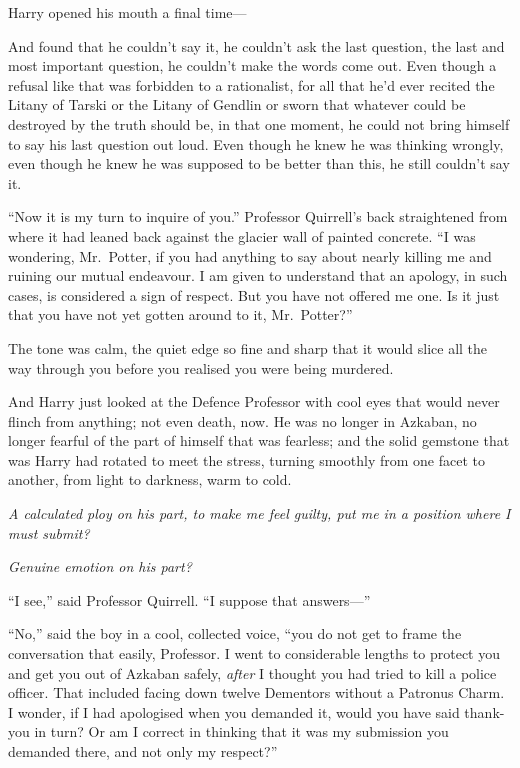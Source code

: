 Harry opened his mouth a final time---

And found that he couldn't say it, he couldn't ask the last question,
the last and most important question, he couldn't make the words come
out. Even though a refusal like that was forbidden to a rationalist, for
all that he'd ever recited the Litany of Tarski or the Litany of Gendlin
or sworn that whatever could be destroyed by the truth should be, in
that one moment, he could not bring himself to say his last question out
loud. Even though he knew he was thinking wrongly, even though he knew
he was supposed to be better than this, he still couldn't say it.

``Now it is my turn to inquire of you.'' Professor Quirrell's back
straightened from where it had leaned back against the glacier wall of
painted concrete. ``I was wondering, Mr.~Potter, if you had anything to
say about nearly killing me and ruining our mutual endeavour. I am given
to understand that an apology, in such cases, is considered a sign of
respect. But you have not offered me one. Is it just that you have not
yet gotten around to it, Mr.~Potter?''

The tone was calm, the quiet edge so fine and sharp that it would slice
all the way through you before you realised you were being murdered.

And Harry just looked at the Defence Professor with cool eyes that would
never flinch from anything; not even death, now. He was no longer in
Azkaban, no longer fearful of the part of himself that was fearless; and
the solid gemstone that was Harry had rotated to meet the stress,
turning smoothly from one facet to another, from light to darkness, warm
to cold.

\emph{A calculated ploy on his part, to make me feel guilty, put me in a
position where I must submit?}

\emph{Genuine emotion on his part?}

``I see,'' said Professor Quirrell. ``I suppose that answers---''

``No,'' said the boy in a cool, collected voice, ``you do not get to
frame the conversation that easily, Professor. I went to considerable
lengths to protect you and get you out of Azkaban safely, \emph{after} I
thought you had tried to kill a police officer. That included facing
down twelve Dementors without a Patronus Charm. I wonder, if I had
apologised when you demanded it, would you have said thank-you in turn?
Or am I correct in thinking that it was my submission you demanded
there, and not only my respect?''


